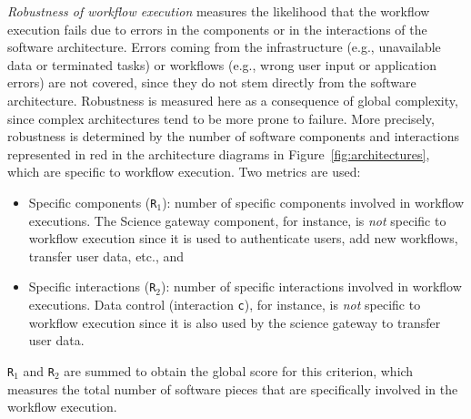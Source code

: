 \documentclass[preprint,3p,twocolumn]{elsarticle}
\newcommand{\note}[2]{\pdfmargincomment[color=yellow,author=#1,open=true]{#2}}
\newcommand{\closednote}[4]{} %
\begin{document}
\emph{Robustness of workflow execution} measures the likelihood that the
workflow execution fails due to errors in the components or in the
interactions of the software architecture. Errors coming
from the infrastructure (e.g., unavailable data or terminated tasks)
or workflows (e.g., wrong user input or application errors) are not
covered, since they do not stem directly from the software
architecture. Robustness is measured here as a consequence of global
complexity, since complex architectures tend to be more prone to
failure. More precisely, robustness is determined by the number of
software components and interactions represented in
red in the architecture diagrams in
Figure~\ref{fig:architectures}, which are specific to workflow
execution. Two metrics are used:
\begin{itemize}[leftmargin=0cm,itemindent=0.35cm,itemsep=0cm]
\item Specific components  (\texttt{R$_1$}): number of specific components
involved in workflow executions. The Science
gateway component, for instance, is \emph{not} specific to workflow execution
since it is used to authenticate users, add new workflows, transfer
user data, etc., and
\item Specific interactions (\texttt{R$_2$}): number of specific
  interactions involved in workflow executions. Data control
  (interaction \texttt{c}), for instance, is \emph{not} specific to
  workflow execution since it is also used by the science gateway to
  transfer user data. \closednote{Sil}{add here an example of an interaction
    that is not, for example, data transfers?}{Tristan}{Done.}
\end{itemize}
\texttt{R$_1$} and \texttt{R$_2$} are
summed to obtain the global score for this criterion, which measures
the total number of software pieces that are specifically involved in
the workflow execution.
\end{document}
